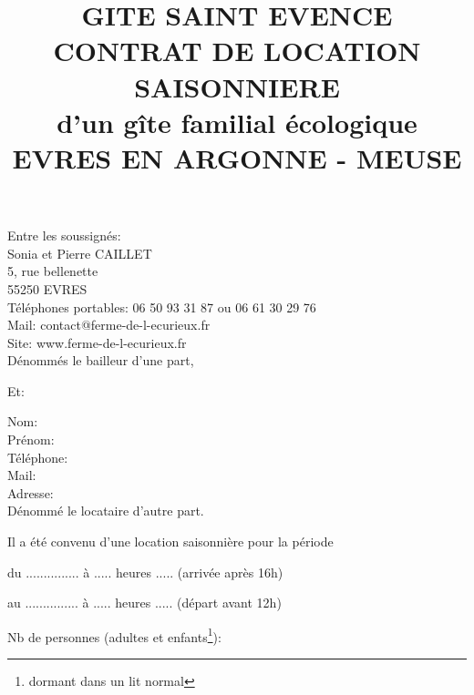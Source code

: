 \documentclass[a4paper,11pt]{article}
\title{GITE SAINT EVENCE\\CONTRAT DE LOCATION SAISONNIERE\\d’un gîte familial écologique\\EVRES EN ARGONNE - MEUSE}
\begin{document}
\date{}
\maketitle

\center Entre les soussignés:\\
\flushleft 
Sonia et Pierre CAILLET\\
5, rue bellenette\\
55250 EVRES\\                                                                                         
Téléphones portables: 06 50 93 31 87 ou 06 61 30 29 76 \\
Mail: contact@ferme-de-l-ecurieux.fr\\
Site: www.ferme-de-l-ecurieux.fr\\

\vspace{0.5cm}
Dénommés le bailleur d’une part,                            

\center Et:

\flushleft
Nom:\\
Prénom:\\
Téléphone:\\
Mail:\\
Adresse:\\

\vspace{0.5cm}
Dénommé le locataire d'autre part.



\flushleft
Il a été convenu d'une location saisonnière pour la période
\vspace{0.5cm}

du   ...............   à .....    heures .....    (arrivée après 16h)
\vspace{0.5cm}

au   ...............   à .....    heures .....   (départ avant 12h)
\vspace{0.5cm}

Nb de personnes (adultes et enfants\footnote{dormant dans un lit normal}): 
\vspace{0.5cm}

\newpage{}




\vspace{0.5cm}
\end{document}
